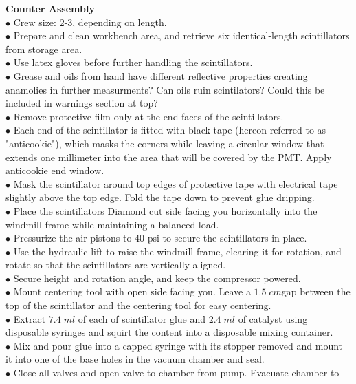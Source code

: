 \textbf{\color[rgb]{1,0.5,0}Counter Assembly}\\
$\bullet$ Crew size: 2-3, depending on length.\\
$\bullet$ Prepare and clean workbench area, and retrieve six identical-length scintillators from storage area.\\
$\bullet$ Use latex gloves before further handling the scintillators.\\
{\color{blue} $\bullet$ Grease and oils from hand have different reflective properties creating anamolies in further measurments? Can oils ruin scintilators? Could this be included in warnings section at top?}\\
$\bullet$ Remove protective film only at the end faces of the scintillators.\\
$\bullet$ Each end of the scintillator is fitted with black tape (hereon referred to as "anticookie"), which masks the corners while leaving a circular window that extends one millimeter into the area that will be covered by the PMT. Apply anticookie end window.\\
$\bullet$ Mask the scintillator around top edges of protective tape with electrical tape slightly above the top edge. Fold the tape down to prevent glue dripping.\\
$\bullet$ Place the scintillators Diamond cut side facing you horizontally into the
windmill frame while maintaining a balanced load.\\
$\bullet$ Pressurize the air pistons to $40$ psi to secure the scintillators in place.\\
$\bullet$ Use the hydraulic lift to raise the windmill frame, clearing it for rotation, and
rotate so that the scintillators are vertically aligned.\\
$\bullet$ Secure height and rotation angle, and keep the compressor powered.\\
$\bullet$ Mount centering tool with open side facing you. Leave a $1.5\;cm$gap between
the top of the scintillator and the centering tool for easy centering.\\
$\bullet$ Extract $7.4 \;ml$ of each of scintillator glue and $2.4\; ml$ of catalyst using disposable
syringes and squirt the content into a disposable mixing container.\\
$\bullet$ Mix and pour glue into a capped syringe with its stopper removed and mount it
into one of the base holes in the vacuum chamber and seal.\\
$\bullet$ Close all valves and open valve to chamber from pump. Evacuate chamber to
